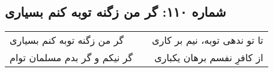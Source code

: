 \begin{center}
\section*{شماره ۱۱۰: گر من زگنه توبه کنم بسیاری}
\label{sec:110}
\begin{longtable}{l p{0.5cm} r}
گر من زگنه توبه کنم بسیاری
&&
تا تو ندهی توبه، نیم بر کاری
\\
گر نیکم و گر بدم مسلمان توام
&&
از کافرِ نفسم برهان یکباری
\\
\end{longtable}
\end{center}

